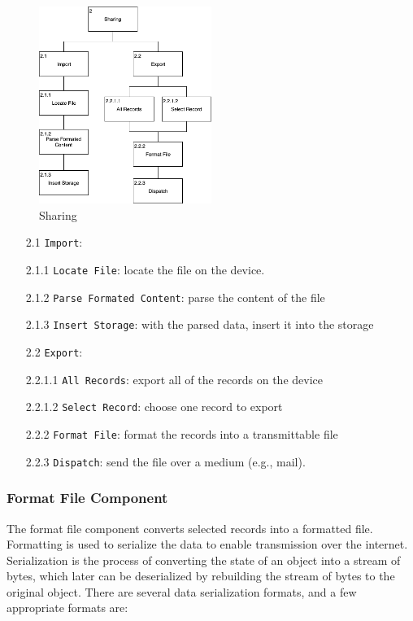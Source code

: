 \begin{figure}
    \centering
    \includegraphics[width=0.5\textwidth]{images/Sharing.png}
    \caption{Sharing}
    \label{fig:hta_sharing}
\end{figure}

\begin{itemize}
    \item[2.1] \verb|Import|:
    \item[2.1.1] \verb|Locate File|: locate the file on the device.
    \item[2.1.2] \verb|Parse Formated Content|: parse the content of the file 
    \item[2.1.3] \verb|Insert Storage|: with the parsed data, insert it into the storage 
    \item[2.2] \verb|Export|:
    \item[2.2.1.1] \verb|All Records|: export all of the records on the device 
    \item[2.2.1.2] \verb|Select Record|: choose one record to export 
    \item[2.2.2] \verb|Format File|: format the records into a transmittable file  
    \item[2.2.3] \verb|Dispatch|: send the file over a medium (e.g., mail).
\end{itemize}


\subsubsection{Format File Component}

The format file component converts selected records into a formatted file. Formatting is used to serialize the data to enable transmission over the internet. Serialization is the process of converting the state of an object into a stream of bytes, which later can be deserialized by rebuilding the stream of bytes to the original object. There are several data serialization formats, and a few appropriate formats are:


